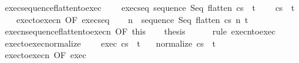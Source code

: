 \begin{isabellebody}
\ exec{\isacharunderscore}sequence{\isacharunderscore}flatten{\isacharunderscore}to{\isacharunderscore}exec{\isacharcolon}\ \isanewline
\ \ \ exec{\isacharunderscore}seq{\isacharcolon}\ {\isachardoublequoteopen}{\isasymGamma}{\isasymturnstile}{\isasymlangle}sequence\ Seq\ {\isacharparenleft}flatten\ c{\isacharparenright}{\isacharcomma}s{\isasymrangle}\ {\isasymRightarrow}\ t{\isachardoublequoteclose}\ \isanewline
\ \ \ {\isachardoublequoteopen}{\isasymGamma}{\isasymturnstile}{\isasymlangle}c{\isacharcomma}s{\isasymrangle}\ {\isasymRightarrow}\ t{\isachardoublequoteclose}\isanewline
%
\isadelimproof
%
\endisadelimproof
%
\isatagproof
{}\isamarkupfalse%
\ {\isacharminus}\isanewline
\ \ \isamarkupfalse%
\ exec{\isacharunderscore}to{\isacharunderscore}execn\ {\isacharbrackleft}OF\ exec{\isacharunderscore}seq{\isacharbrackright}\isanewline
\ \ \isamarkupfalse%
\ n\ \ {\isachardoublequoteopen}{\isasymGamma}{\isasymturnstile}{\isasymlangle}sequence\ Seq\ {\isacharparenleft}flatten\ c{\isacharparenright}{\isacharcomma}s{\isasymrangle}\ {\isacharequal}n{\isasymRightarrow}\ t{\isachardoublequoteclose}\isacommand{{\isachardot}{\isachardot}}\isamarkupfalse%
\isanewline
\ \ \isamarkupfalse%
\ execn{\isacharunderscore}sequence{\isacharunderscore}flatten{\isacharunderscore}to{\isacharunderscore}execn\ {\isacharbrackleft}OF\ this{\isacharbrackright}\isanewline
\ \ \isamarkupfalse%
\ {\isacharquery}thesis\isanewline
\ \ \ \ \isamarkupfalse%
\ {\isacharparenleft}rule\ execn{\isacharunderscore}to{\isacharunderscore}exec{\isacharparenright}\isanewline
{}\isamarkupfalse%
%
\endisatagproof
{\isafoldproof}%
%
\isadelimproof
\isanewline
%
\endisadelimproof
\isanewline
{}\isamarkupfalse%
\ exec{\isacharunderscore}to{\isacharunderscore}exec{\isacharunderscore}normalize{\isacharcolon}\ \isanewline
\ \ \ exec{\isacharcolon}\ {\isachardoublequoteopen}{\isasymGamma}{\isasymturnstile}{\isasymlangle}c{\isacharcomma}s{\isasymrangle}\ {\isasymRightarrow}\ t{\isachardoublequoteclose}\isanewline
\ \ \ {\isachardoublequoteopen}{\isasymGamma}{\isasymturnstile}{\isasymlangle}normalize\ c{\isacharcomma}s{\isasymrangle}\ {\isasymRightarrow}\ t{\isachardoublequoteclose}\isanewline
%
\isadelimproof
%
\endisadelimproof
%
\isatagproof
{}\isamarkupfalse%
\ {\isacharminus}\isanewline
\ \ \isamarkupfalse%
\ exec{\isacharunderscore}to{\isacharunderscore}execn\ {\isacharbrackleft}OF\ exec{\isacharbrackright}\ \isamarkupfalse%

\end{isabellebody}
